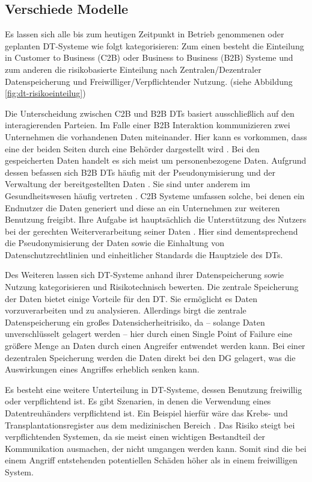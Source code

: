 \documentclass[
	fontsize=11pt,
	headings=small,
	parskip=half,           %
	bibliography=totoc,
	numbers=noenddot,       %
	open=any,               %
]{scrreprt}
\begin{document}
\subsection{Verschiede Modelle}
Es lassen sich alle bis zum heutigen Zeitpunkt in Betrieb genommenen oder geplanten DT-Systeme wie folgt kategorisieren: Zum einen besteht die Einteilung in Customer to Business (C2B) oder Business to Business (B2B) Systeme und zum anderen die risikobasierte Einteilung nach Zentralen/Dezentraler Datenspeicherung und Freiwilliger/Verpflichtender Nutzung. (siehe Abbildung \ref{fig:dt-risikoeinteilug})

Die Unterscheidung zwischen C2B und B2B DTs basiert ausschließlich auf den interagierenden Parteien. Im Falle einer B2B Interaktion kommunizieren zwei Unternehmen die vorhandenen Daten miteinander. Hier kann es vorkommen, dass eine der beiden Seiten durch eine Behörder dargestellt wird \cite{dt-blankertz2020datentreuhandmodelle}. Bei den gespeicherten Daten handelt es sich meist um personenbezogene Daten. Aufgrund dessen befassen sich B2B DTs häufig mit der Pseudonymisierung und der Verwaltung der bereitgestellten Daten . Sie sind unter anderem im Gesundheitswesen häufig vertreten \cite{dt-blankertz2020datentreuhandmodelle}.
C2B Systeme umfassen solche, bei denen ein Endnutzer die Daten generiert und diese an ein Unternehmen zur weiteren Benutzung freigibt. Ihre Aufgabe ist hauptsächlich die Unterstützung des Nutzers bei der gerechten Weiterverarbeitung seiner Daten \cite{dt-blankertz2020datentreuhandmodelle}. Hier sind dementsprechend die Pseudonymisierung der Daten sowie die Einhaltung von Datenschutzrechtlinien und einheitlicher Standards die Hauptziele des DTs.

Des Weiteren lassen sich DT-Systeme anhand ihrer Datenspeicherung sowie Nutzung kategorisieren und Risikotechnisch bewerten. Die zentrale Speicherung der Daten bietet einige Vorteile für den DT. Sie ermöglicht es Daten vorzuverarbeiten und zu analysieren. Allerdings birgt die zentrale Datenspeicherung ein großes Datensicherheitrisiko, da -- solange Daten unverschlüsselt gelagert werden -- hier durch einen Single Point of Failure eine größere Menge an Daten durch einen Angreifer entwendet werden kann. Bei einer dezentralen Speicherung werden die Daten direkt bei den DG gelagert, was die Auswirkungen eines Angriffes erheblich senken kann. 

Es besteht eine weitere Unterteilung in DT-Systeme, dessen Benutzung freiwillig oder verpflichtend ist. Es gibt Szenarien, in denen die Verwendung eines Datentreuhänders verpflichtend ist. Ein Beispiel hierfür wäre das Krebs- und Transplantationsregister aus dem medizinischen Bereich \cite{dt-christmann2022krebsregister, dt-nageltransplatationsregister}. Das Risiko steigt bei verpflichtenden Systemen, da sie meist einen wichtigen Bestandteil der Kommunikation ausmachen, der nicht umgangen werden kann. Somit sind die bei einem Angriff entstehenden potentiellen Schäden höher als in einem freiwilligen System.
\end{document}
